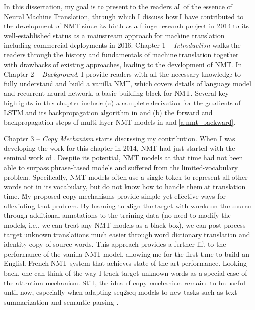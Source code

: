 In this dissertation, my goal is to present to the readers all of the essence of Neural Machine Translation, through which I discuss how I have contributed to the development of NMT since its birth as a fringe research project in 2014 to its well-established status as a mainstream approach for machine translation including commercial deployments in 2016. Chapter 1 -- {\it Introduction} walks the readers through the history and fundamentals of machine translation together with drawbacks of existing approaches, leading to the development of NMT. In Chapter 2 -- {\it Background}, I provide readers with all the necessary knowledge to fully understand and build a vanilla NMT, which covers details of language model and recurrent neural network, a basic building block for NMT. Several key highlights in this chapter include (a) a complete derivation for the gradients of LSTM and its backpropagation algorithm in  and (b) the forward and backpropagation steps of multi-layer NMT models in  and \ref{a:nmt_backward}. 

Chapter 3 -- {\it Copy Mechanism} starts discussing my contribution. When I was developing the work for this chapter in 2014,
NMT had just started with the seminal work of . Despite its potential, NMT models at that time had not been able to surpass phrase-based models and suffered from the limited-vocabulary problem. Specifically, NMT models often use a single \unk{} token to represent all other words not in its vocabulary, but do not know how to handle them at translation time. My proposed copy mechanisms provide simple yet effective ways for alleviating that problem. By learning to align the target \unk{} with words on the source through additional annotations to the training data (no need to modify the models, i.e., we can treat any NMT models as a black box), we can post-process target unknown translations much easier through word dictionary translation and identity copy of source words. This approach provides a further lift to the performance of the vanilla NMT model, allowing me for the first time to build an English-French NMT system that achieves state-of-the-art performance. Looking back, one can think of the way I track target unknown words as a special case of the attention mechanism.
Still, the idea of copy mechanism remains to be useful until now, especially when adapting seq2seq models to new tasks such as text summarization \cite{gu16,gulcehre16} and semantic parsing \cite{jia16}.

